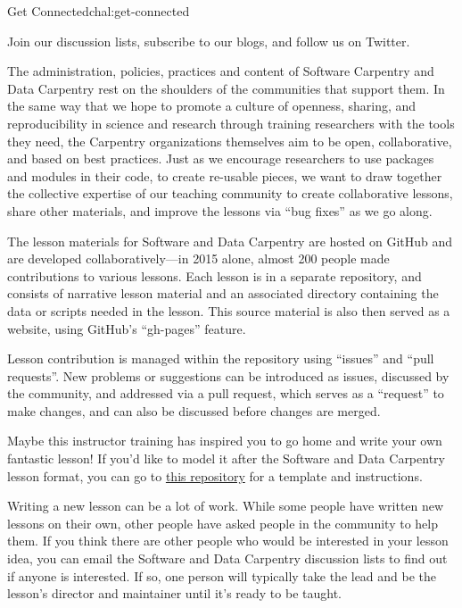\begin{challenge}{Get Connected}{chal:get-connected}

Join our discussion lists, subscribe to our blogs, and follow us on
Twitter.
\end{challenge}


The administration, policies, practices and content of Software
Carpentry and Data Carpentry rest on the shoulders of the communities
that support them. In the same way that we hope to promote a culture of
openness, sharing, and reproducibility in science and research through
training researchers with the tools they need, the Carpentry
organizations themselves aim to be open, collaborative, and based on
best practices. Just as we encourage researchers to use packages and
modules in their code, to create re-usable pieces, we want to draw
together the collective expertise of our teaching community to create
collaborative lessons, share other materials, and improve the lessons
via ``bug fixes'' as we go along.


The lesson materials for Software and Data Carpentry are hosted on
GitHub
and are developed collaboratively---in 2015 alone, almost 200 people
made contributions to various lessons. Each lesson is in a separate
repository, and consists of narrative lesson material and an associated
directory containing the data or scripts needed in the lesson. This
source material is also then served as a website, using GitHub's
``gh-pages'' feature.

Lesson contribution is managed within the repository using ``issues''
and ``pull requests''. New problems or suggestions can be introduced as
issues, discussed by the community, and addressed via a pull request,
which serves as a ``request'' to make changes, and can also be discussed
before changes are merged.


Maybe this instructor training has inspired you to go home and write
your own fantastic lesson! If you'd like to model it after the Software
and Data Carpentry lesson format, you can go to
\href{fixme}{this repository} for a template
and instructions.

Writing a new lesson can be a lot of work. While some people have
written new lessons on their own, other people have asked people in the
community to help them. If you think there are other people who would be
interested in your lesson idea, you can email the Software and Data
Carpentry discussion lists to find out if anyone is interested. If so,
one person will typically take the lead and be the lesson's director and
maintainer until it's ready to be taught.

